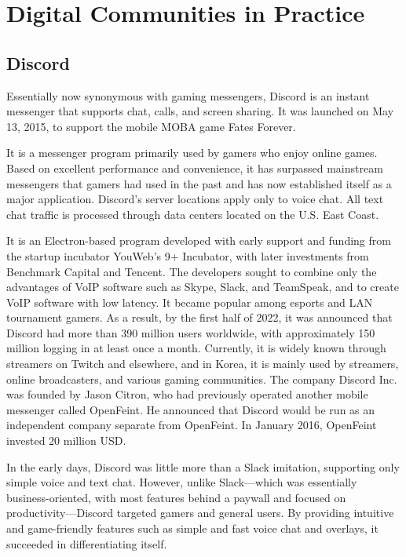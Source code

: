 \chapter{Digital Communities in Practice}

\section{Discord}
Essentially now synonymous with gaming messengers, Discord is an instant messenger that supports chat, calls, and screen sharing. It was launched on May 13, 2015, to support the mobile MOBA game Fates Forever.  

It is a messenger program primarily used by gamers who enjoy online games. Based on excellent performance and convenience, it has surpassed mainstream messengers that gamers had used in the past and has now established itself as a major application. Discord’s server locations apply only to voice chat. All text chat traffic is processed through data centers located on the U.S. East Coast.  

It is an Electron-based program developed with early support and funding from the startup incubator YouWeb's 9+ Incubator, with later investments from Benchmark Capital and Tencent. The developers sought to combine only the advantages of VoIP software such as Skype, Slack, and TeamSpeak, and to create VoIP software with low latency. It became popular among esports and LAN tournament gamers. As a result, by the first half of 2022, it was announced that Discord had more than 390 million users worldwide, with approximately 150 million logging in at least once a month. Currently, it is widely known through streamers on Twitch and elsewhere, and in Korea, it is mainly used by streamers, online broadcasters, and various gaming communities. The company Discord Inc. was founded by Jason Citron, who had previously operated another mobile messenger called OpenFeint. He announced that Discord would be run as an independent company separate from OpenFeint. In January 2016, OpenFeint invested 20 million USD.  

In the early days, Discord was little more than a Slack imitation, supporting only simple voice and text chat. However, unlike Slack—which was essentially business-oriented, with most features behind a paywall and focused on productivity—Discord targeted gamers and general users. By providing intuitive and game-friendly features such as simple and fast voice chat and overlays, it succeeded in differentiating itself.  

